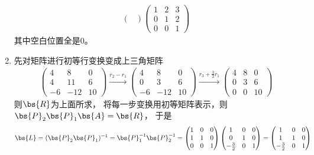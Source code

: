 \documentclass[12pt, a4paper, oneside, UTF8]{ctexbook}
\begin{document}
\begin{solution}
\begin{enumerate}[label=(\arabic*)]
\begin{align*}
\begin{pmatrix}
            \end{pmatrix}
            \begin{pmatrix}
                1 & 2 & 3\\
                0&1&2\\
                0 & 0& 1
            \end{pmatrix}
        \end{align*}
        其中空白位置全是$0$。
    \item 先对矩阵进行初等行变换变成上三角矩阵
    \begin{align*}
        \begin{pmatrix}
        4 & 8&0\\
        4& 11 & 6\\
        -6 & -12 &10
        \end{pmatrix}\xrightarrow{r_2-r_1}
        \begin{pmatrix}
        4 & 8&0\\
        0& 3 & 6\\
        -6 & -12 &10
        \end{pmatrix}\xrightarrow{r_3+\frac{3}{2}r_1}
        \begin{pmatrix}
        4 & 8&0\\
        0& 3 & 6\\
        0 & 0 &10
        \end{pmatrix}
    \end{align*}
    则$\bs{R}$为上面所求，
    将每一步变换用初等矩阵表示，则$\bs{P}_2\bs{P}_1\bs{A}=\bs{R}$，
    于是
    \begin{align*}
        \bs{L}=(\bs{P}_2\bs{P}_1)^{-1}
        =\bs{P}_1^{-1}\bs{P}_2^{-1}
        =\begin{pmatrix}
            1& 0 &0\\
            1&1&0\\
            0&0&1
        \end{pmatrix}
        \begin{pmatrix}
            1& 0 &0\\
            0&1&0\\
            -\frac{3}{2}&0&1
        \end{pmatrix}
        =\begin{pmatrix}
            1& 0 &0\\
            1&1&0\\
            -\frac{3}{2}&0&1
        \end{pmatrix}
    \end{align*}

\end{enumerate}
\end{solution}
\end{document}
